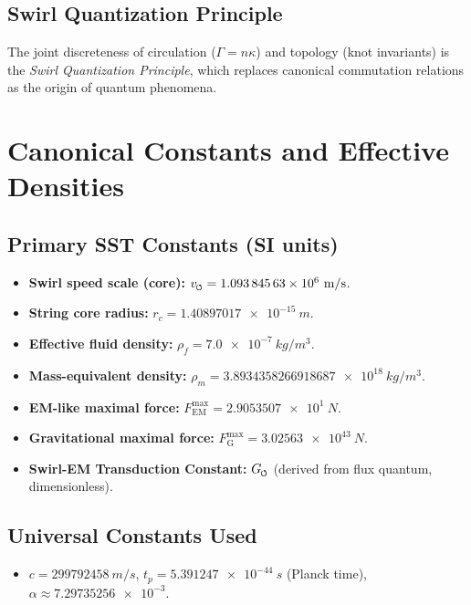 \documentclass[11pt]{article}
\newcommand{\swirlarrow}{%
    \mathchoice{\mkern-2mu\scriptstyle\boldsymbol{\circlearrowleft}}%
    {\mkern-2mu\scriptstyle\boldsymbol{\circlearrowleft}}%
    {\mkern-2mu\scriptscriptstyle\boldsymbol{\circlearrowleft}}%
    {\mkern-2mu\scriptscriptstyle\boldsymbol{\circlearrowleft}}%
}
\newcommand{\vscore}{v_{\swirlarrow}}                    %
\newcommand{\rhof}{\rho_{\!f}}                           %
\newcommand{\rhom}{\rho_{\!m}}                           %
\newcommand{\rc}{r_c}                                    %
\newcommand{\FmaxEM}{F_{\mathrm{EM}}^{\max}}             %
\newcommand{\FmaxG}{F_{\mathrm{G}}^{\max}}               %
\begin{document}
    \subsection{Swirl Quantization Principle}
        \label{sec:swirl_quantization}
        The joint discreteness of circulation ($\Gamma = n\kappa$) and topology (knot invariants) is the \emph{Swirl Quantization Principle}, which replaces canonical commutation relations as the origin of quantum phenomena.

\section{Canonical Constants and Effective Densities}
    \label{sec:canonical_constants}
    \subsection*{Primary SST Constants (SI units)}
        \begin{itemize}
        \item \textbf{Swirl speed scale (core):} $\vscore = \num{1.09384563e6}\ \si{m/s}$.
        \item \textbf{String core radius:} $\rc = \num{1.40897017e-15}\ \si{m}$.
        \item \textbf{Effective fluid density:} $\rhof = \num{7.0e-7}\ \si{kg/m^3}$.
        \item \textbf{Mass-equivalent density:} $\rhom = \num{3.8934358266918687e18}\ \si{kg/m^3}$.
        \item \textbf{EM-like maximal force:} $\FmaxEM = \num{2.9053507e1}\ \si{N}$.
        \item \textbf{Gravitational maximal force:} $\FmaxG = \num{3.02563e43}\ \si{N}$.
        \item \textbf{Swirl-EM Transduction Constant:} $G_{\swirlarrow}$ (derived from flux quantum, dimensionless).
        \end{itemize}

    \subsection*{Universal Constants Used}
        \begin{itemize}
        \item $c=\num{299792458}\ \si{m/s}$, \quad $t_p=\num{5.391247e-44}\ \si{s}$ (Planck time), \quad $\alpha \approx \num{7.29735256e-3}$.
        \end{itemize}
\end{document}
